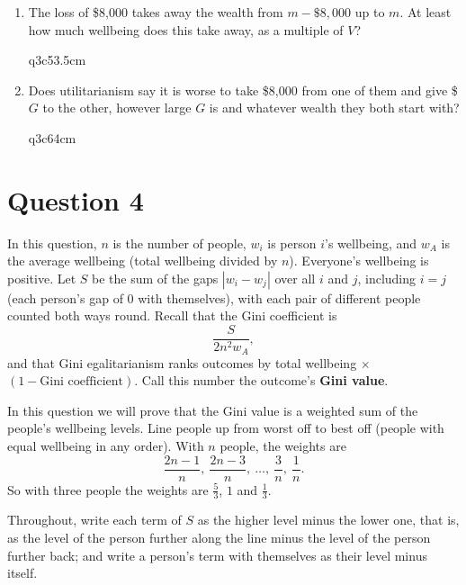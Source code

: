 \begin{Form}
\begin{enumerate}
\begin{enumerate}
    \item The loss of \$8{,}000 takes away the wealth from $m - \$8{,}000$ up to $m$. At least how much wellbeing does this take away, as a multiple of $V$?
\begin{answer}{q3c5}{3.5cm}
\end{answer}

    \item Does utilitarianism say it is worse to take \$8{,}000 from one of them and give \$$G$ to the other, however large $G$ is and whatever wealth they both start with?
\begin{answer}{q3c6}{4cm}
\end{answer}

  \end{enumerate}
\end{enumerate}

\section*{Question 4}

In this question, $n$ is the number of people, $w_i$ is person $i$'s wellbeing, and $w_A$ is the average wellbeing (total wellbeing divided by $n$). Everyone's wellbeing is positive. Let $S$ be the sum of the gaps $|w_i - w_j|$ over all $i$ and $j$, including $i = j$ (each person's gap of $0$ with themselves), with each pair of different people counted both ways round. Recall that the Gini coefficient is
\[
  \frac{S}{2n^2 w_A},
\]
and that Gini egalitarianism ranks outcomes by total wellbeing $\times$ $(1 - \text{Gini coefficient})$. Call this number the outcome's \textbf{Gini value}.

In this question we will prove that the Gini value is a weighted sum of the people's wellbeing levels. Line people up from worst off to best off (people with equal wellbeing in any order). With $n$ people, the weights are
\[
  \frac{2n-1}{n},\ \frac{2n-3}{n},\ \dots,\ \frac{3}{n},\ \frac{1}{n}.
\]
So with three people the weights are $\tfrac53$, $1$ and $\tfrac13$.

Throughout, write each term of $S$ as the higher level minus the lower one, that is, as the level of the person further along the line minus the level of the person further back; and write a person's term with themselves as their level minus itself.


\end{Form}
